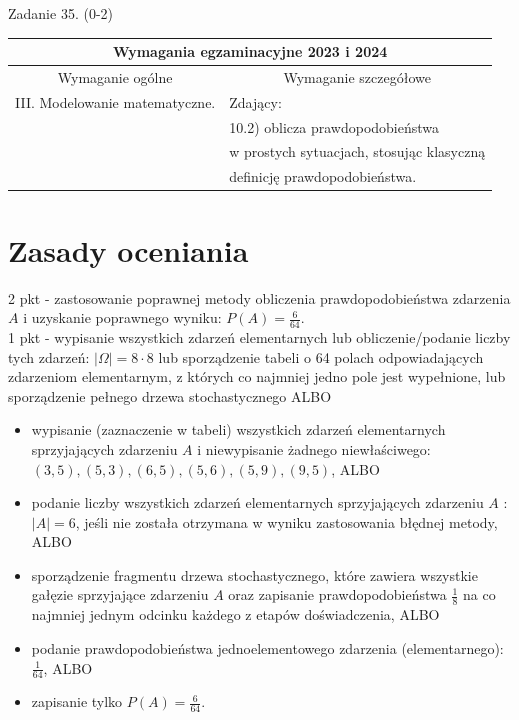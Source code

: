 \documentclass[10pt]{article}
\begin{document}
Zadanie 35. (0-2)

\begin{center}
\begin{tabular}{|l|l|}
\hline
\multicolumn{2}{|c|}{Wymagania egzaminacyjne 2023 i 2024} \\
\hline
\multicolumn{1}{|c|}{Wymaganie ogólne} & \multicolumn{1}{c|}{Wymaganie szczegółowe} \\
\hline
III. Modelowanie matematyczne. & Zdający: \\
 & 10.2) oblicza prawdopodobieństwa \\
 & w prostych sytuacjach, stosując klasyczną \\
 & definicję prawdopodobieństwa. \\
\hline
\end{tabular}
\end{center}

\section*{Zasady oceniania}
2 pkt - zastosowanie poprawnej metody obliczenia prawdopodobieństwa zdarzenia $A$ i uzyskanie poprawnego wyniku: $P(A)=\frac{6}{64}$.\\
1 pkt - wypisanie wszystkich zdarzeń elementarnych lub obliczenie/podanie liczby tych zdarzeń: $|\Omega|=8 \cdot 8$ lub sporządzenie tabeli o 64 polach odpowiadających zdarzeniom elementarnym, z których co najmniej jedno pole jest wypełnione, lub sporządzenie pełnego drzewa stochastycznego ALBO

\begin{itemize}
  \item wypisanie (zaznaczenie w tabeli) wszystkich zdarzeń elementarnych sprzyjających zdarzeniu $A$ i niewypisanie żadnego niewłaściwego:\\
$(3,5),(5,3),(6,5),(5,6),(5,9),(9,5)$, ALBO
  \item podanie liczby wszystkich zdarzeń elementarnych sprzyjających zdarzeniu $A$ : $|A|=6$, jeśli nie została otrzymana w wyniku zastosowania błędnej metody, ALBO
  \item sporządzenie fragmentu drzewa stochastycznego, które zawiera wszystkie gałęzie sprzyjające zdarzeniu $A$ oraz zapisanie prawdopodobieństwa $\frac{1}{8}$ na co najmniej jednym odcinku każdego z etapów doświadczenia, ALBO
  \item podanie prawdopodobieństwa jednoelementowego zdarzenia (elementarnego): $\frac{1}{64}$, ALBO
  \item zapisanie tylko $P(A)=\frac{6}{64}$.
\end{itemize}
\end{document}
